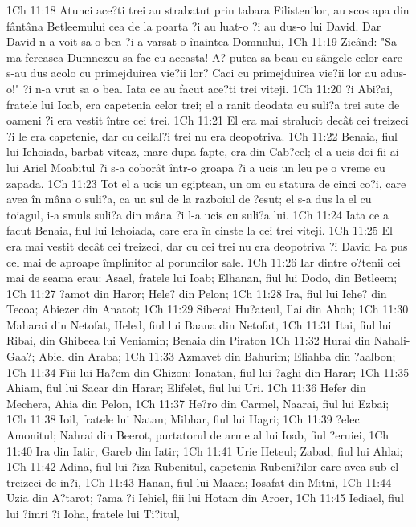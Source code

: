 1Ch 11:18  Atunci ace?ti trei au strabatut prin tabara Filistenilor, au scos apa din fântâna Betleemului cea de la poarta ?i au luat-o ?i au dus-o lui David. Dar David n-a voit sa o bea ?i a varsat-o înaintea Domnului,
1Ch 11:19  Zicând: "Sa ma fereasca Dumnezeu sa fac eu aceasta! A? putea sa beau eu sângele celor care s-au dus acolo cu primejduirea vie?ii lor? Caci cu primejduirea vie?ii lor au adus-o!" ?i n-a vrut sa o bea. Iata ce au facut ace?ti trei viteji.
1Ch 11:20  ?i Abi?ai, fratele lui Ioab, era capetenia celor trei; el a ranit deodata cu suli?a trei sute de oameni ?i era vestit între cei trei.
1Ch 11:21  El era mai stralucit decât cei treizeci ?i le era capetenie, dar cu ceilal?i trei nu era deopotriva.
1Ch 11:22  Benaia, fiul lui Iehoiada, barbat viteaz, mare dupa fapte, era din Cab?eel; el a ucis doi fii ai lui Ariel Moabitul ?i s-a coborât într-o groapa ?i a ucis un leu pe o vreme cu zapada.
1Ch 11:23  Tot el a ucis un egiptean, un om cu statura de cinci co?i, care avea în mâna o suli?a, ca un sul de la razboiul de ?esut; el s-a dus la el cu toiagul, i-a smuls suli?a din mâna ?i l-a ucis cu suli?a lui.
1Ch 11:24  Iata ce a facut Benaia, fiul lui Iehoiada, care era în cinste la cei trei viteji.
1Ch 11:25  El era mai vestit decât cei treizeci, dar cu cei trei nu era deopotriva ?i David l-a pus cel mai de aproape împlinitor al poruncilor sale.
1Ch 11:26  Iar dintre o?tenii cei mai de seama erau: Asael, fratele lui Ioab; Elhanan, fiul lui Dodo, din Betleem;
1Ch 11:27  ?amot din Haror; Hele? din Pelon;
1Ch 11:28  Ira, fiul lui Iche? din Tecoa; Abiezer din Anatot;
1Ch 11:29  Sibecai Hu?ateul, Ilai din Ahoh;
1Ch 11:30  Maharai din Netofat, Heled, fiul lui Baana din Netofat,
1Ch 11:31  Itai, fiul lui Ribai, din Ghibeea lui Veniamin; Benaia din Piraton
1Ch 11:32  Hurai din Nahali-Gaa?; Abiel din Araba;
1Ch 11:33  Azmavet din Bahurim; Eliahba din ?aalbon;
1Ch 11:34  Fiii lui Ha?em din Ghizon: Ionatan, fiul lui ?aghi din Harar;
1Ch 11:35  Ahiam, fiul lui Sacar din Harar; Elifelet, fiul lui Uri.
1Ch 11:36  Hefer din Mechera, Ahia din Pelon,
1Ch 11:37  He?ro din Carmel, Naarai, fiul lui Ezbai;
1Ch 11:38  Ioil, fratele lui Natan; Mibhar, fiul lui Hagri;
1Ch 11:39  ?elec Amonitul; Nahrai din Beerot, purtatorul de arme al lui Ioab, fiul ?eruiei,
1Ch 11:40  Ira din Iatir, Gareb din Iatir;
1Ch 11:41  Urie Heteul; Zabad, fiul lui Ahlai;
1Ch 11:42  Adina, fiul lui ?iza Rubenitul, capetenia Rubeni?ilor care avea sub el treizeci de in?i,
1Ch 11:43  Hanan, fiul lui Maaca; Iosafat din Mitni,
1Ch 11:44  Uzia din A?tarot; ?ama ?i Iehiel, fiii lui Hotam din Aroer,
1Ch 11:45  Iediael, fiul lui ?imri ?i Ioha, fratele lui Ti?itul,
